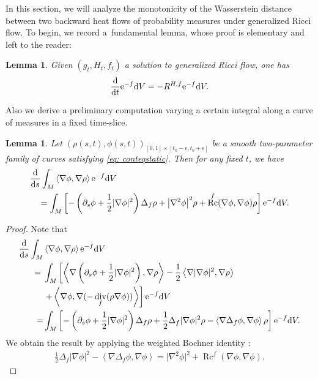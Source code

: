 \documentclass[pdftex]{sigma}
\numberwithin{equation}{section}
\newtheorem{Lemma}[thm]{Lemma}
\newcommand{\del}{\partial}
\newcommand{\eps}{\epsilon}
\newcommand{\N}{\nabla}
\newcommand{\IP}[1]{\left<#1\right>}
\DeclareMathOperator{\Rc}{Rc}
\DeclareMathOperator{\divg}{div}
\begin{document}
In this section, we will analyze the monotonicity of the Wasserstein distance between two backward heat flows of probability measures under generalized Ricci flow. To begin, we record a~fundamental lemma, whose proof is elementary and left to the reader:

\begin{Lemma} \label{l:volumeev} Given $(g_t, H_t, f_t)$ a solution to generalized Ricci flow, one has
\begin{align*}
 \frac{{\rm d}}{{\rm d}t} {\rm e}^{-f} {\rm d}V = - R^{H,f} {\rm e}^{-f} {\rm d}V.
\end{align*}
\end{Lemma}

Also we derive a preliminary computation varying a certain integral along a curve of measures in a fixed time-slice.

\begin{Lemma}\label{lemma: staticderivative} Let $(\rho(s,t),\phi(s,t))_{[0,1]\times [t_0-\eps,t_0+\eps]}$ be a smooth two-parameter family of curves satisfying \eqref{eq: conteqstatic}.
Then for any fixed $t$, we have
 \begin{align*}
& \frac{{\rm d}}{{\rm d}s}\int_M \IP{\N\phi,\N\rho}{\rm e}^{-f} {\rm d}V\\
&\quad =\int_M \left[ - \left(\del_s\phi+\frac12|\N\phi|^2\right)\Delta_f\rho +\big|\N^2\phi\big|^2 \rho + \Rc^f(\N\phi,\N\phi) \rho \right] {\rm e}^{-f} {\rm d}V.
 \end{align*}
\end{Lemma}
\begin{proof}
 Note that
 \begin{align*}
 \frac{{\rm d}}{{\rm d}s}\int_M & \IP{\N\phi,\N\rho}{\rm e}^{-f} {\rm d}V\\
 ={}&\int_M \left[ \IP{\N\left(\del_s\phi+\frac12|\N\phi|^2\right),\N\rho} - \frac12\IP{\N|\N\phi|^2,\N\rho} \right.\\
 &\left.+ \IP{\N\phi,\N(-\divg_f(\rho\N\phi))} \right] {\rm e}^{-f} {\rm d}V\\
 =& \int_M \left[ - \left(\del_s\phi+\frac12|\N\phi|^2\right)\Delta_f\rho + \frac12 \Delta_f|\N\phi|^2 \rho - \IP{\N\Delta_f\phi,\N\phi}\rho \right] {\rm e}^{-f} {\rm d}V.
 \end{align*}
 We obtain the result by applying the weighted Bochner identity \cite[Proposition 3]{BE}:
 \begin{align*}
 \frac12\Delta_f|\N\phi|^2-\IP{\N\Delta_f\phi,\N\phi}=\big|\N^2\phi\big|^2+\Rc^f(\N\phi,\N\phi).
\tag*{\qed}
 \end{align*} \renewcommand{\qed}{}
\end{proof}
\end{document}
